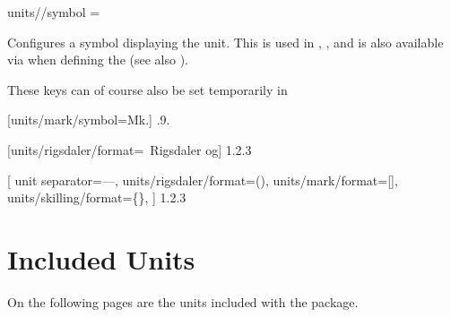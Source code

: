 \documentclass[
	a4paper,
]{article}
\begin{document}
\begin{docKey}
	[]
	[doc label=units:symbol]
	{units//symbol}
	{=}
	{}

	Configures a symbol displaying the unit. This is used in , , and is also available via  when defining the  (see also ).
\end{docKey}

These keys can of course also be set temporarily in 

\begin{dispExample}
	[units/mark/symbol=Mk.]
	{.9.}

	[units/rigsdaler/format={\VALUE~Rigsdaler og}]
	{1.2.3}

[
		unit separator={---},
		units/rigsdaler/format={(\VALUE)},
		units/mark/format={[\VALUE]},
		units/skilling/format={\{\VALUE\}},
	]
	{1.2.3}
\end{dispExample}

\clearpage
\section{Included Units} %

\label{units:included}
On the following pages are the units included with the package.


\clearpage
{}


\printindex  %
\end{document}
